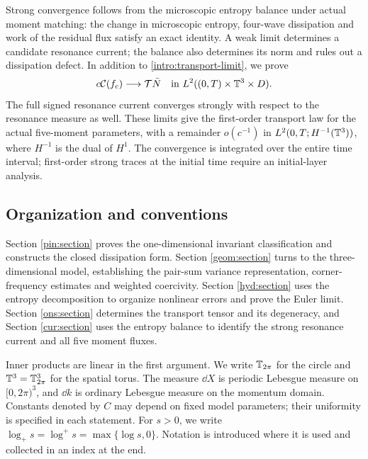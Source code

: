 Strong convergence follows from the microscopic entropy balance under
actual moment matching: the change in microscopic entropy, four-wave
dissipation and work of the residual flux satisfy an exact identity.
A weak limit determines a candidate resonance current; the balance
also determines its norm and rules out a dissipation defect.
In addition to \eqref{intro:transport-limit}, we prove
\begin{equation}\label{intro:physical-current}
 c\mathcal C(f_c)\longrightarrow\mathcal T\bar N
 \quad\text{in }L^2((0,T)\times\mathbb T^3\times D).
\end{equation}
The full signed resonance current converges strongly with respect to
the resonance measure as well. These limits give the first-order transport
law for the actual five-moment parameters, with a remainder
$o(c^{-1})$ in $L^2(0,T;H^{-1}(\mathbb T^3))$, where $H^{-1}$ is the dual of
$H^1$. The convergence is integrated over the entire time interval;
first-order strong traces at the initial time require an initial-layer
analysis.

\subsection{Organization and conventions}

Section \ref{pin:section} proves the one-dimensional invariant classification
and constructs the closed dissipation form. Section \ref{geom:section}
turns to the three-dimensional model, establishing the pair-sum variance
representation, corner-frequency estimates and weighted coercivity.
Section \ref{hyd:section} uses the entropy decomposition to organize
nonlinear errors and prove the Euler limit. Section \ref{ons:section}
determines the transport tensor and its degeneracy, and
Section \ref{cur:section} uses the entropy balance to identify the strong
resonance current and all five moment fluxes.

Inner products are linear in the first argument. We write $\mathbb T_{2\pi}$ for
the circle and $\mathbb T^3=\mathbb T_{2\pi}^3$ for the spatial torus.
The measure $\dd X$ is periodic Lebesgue measure on $[0,2\pi)^3$,
and $\dd k$ is ordinary Lebesgue measure on the momentum domain.
Constants denoted by $C$ may depend on fixed model parameters; their
uniformity is specified in each statement. For $s>0$, we write
$\log_+s=\log^+s=\max\{\log s,0\}$.
Notation is introduced
where it is used and collected in an index at the end.
